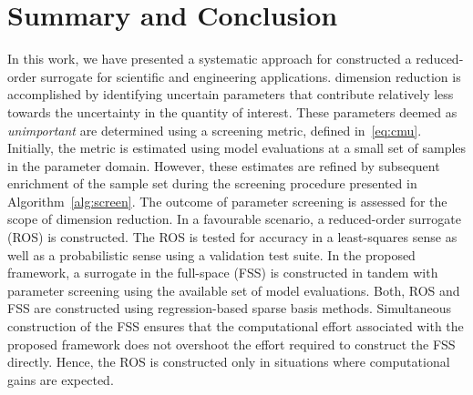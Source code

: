 \section{Summary and Conclusion}
\label{sec:disc}


In this work, we have presented a systematic approach for constructed a reduced-order
surrogate for scientific and engineering applications. dimension reduction is accomplished
by identifying uncertain parameters that contribute relatively less towards the uncertainty
in the quantity of interest. These parameters deemed as \textit{unimportant} are determined
using a screening metric, defined in~\eqref{eq:cmu}. Initially, the metric is estimated
using model evaluations at a small set of samples in the parameter domain. However, these
estimates are refined by subsequent enrichment of the sample set during the screening
procedure presented in Algorithm~\ref{alg:screen}. The outcome of parameter screening is
assessed for the scope of dimension reduction. In a favourable scenario, a reduced-order
surrogate (ROS) is constructed. The ROS is tested for accuracy in a least-squares sense
as well as a probabilistic sense using a validation test suite. In the proposed framework,
a surrogate in the full-space (FSS) is constructed in tandem with parameter screening using
the available set of model evaluations. Both, ROS and FSS are
constructed using regression-based sparse basis methods. Simultaneous construction
of the FSS ensures that the computational effort associated with the proposed framework
does not overshoot the effort required to construct the FSS directly.
Hence, the ROS is constructed only in situations where computational gains are
expected. 

